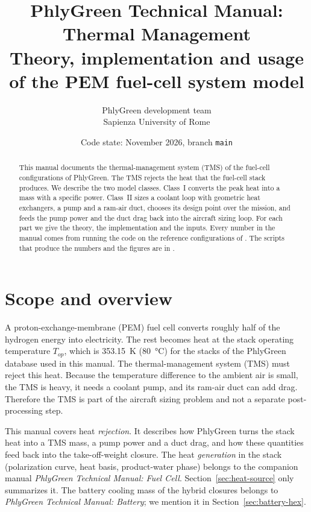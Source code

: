 \documentclass[a4paper,11pt]{article}
\title{PhlyGreen Technical Manual: Thermal Management\\[4pt]
\large Theory, implementation and usage of the PEM fuel-cell system model}
\author{PhlyGreen development team\\Sapienza University of Rome}
\date{Code state: November 2026, branch \texttt{main}}
\begin{document}
\maketitle

\begin{abstract}
\noindent This manual documents the thermal-management system (TMS) of the fuel-cell
configurations of PhlyGreen. The TMS rejects the heat that the fuel-cell stack produces. We
describe the two model classes. Class~I converts the peak heat into a mass with a specific
power. Class~II sizes a coolant loop with geometric heat exchangers, a pump and a ram-air
duct, chooses its design point over the mission, and feeds the pump power and the duct drag
back into the aircraft sizing loop. For each part we give the theory, the implementation and
the inputs. Every number in the manual comes from running the code on the reference
configurations of . The scripts that produce the numbers and
the figures are in .
\end{abstract}

\tableofcontents
\newpage

\section{Scope and overview}\label{sec:scope}

A proton-exchange-membrane (PEM) fuel cell converts roughly half of the hydrogen energy
into electricity. The rest becomes heat at the stack operating temperature $T_{op}$, which
is \SI{353.15}{K} (\SI{80}{\celsius}) for the stacks of the PhlyGreen database used in this
manual. The thermal-management system (TMS) must reject this heat. Because the temperature
difference to the ambient air is small, the TMS is heavy, it needs a coolant pump, and its
ram-air duct can add drag. Therefore the TMS is part of the aircraft sizing problem and not
a separate post-processing step.

This manual covers heat \emph{rejection}. It describes how PhlyGreen turns the stack heat
into a TMS mass, a pump power and a duct drag, and how these quantities feed back into the
take-off-weight closure. The heat \emph{generation} in the stack (polarization curve, heat
basis, product-water phase) belongs to the companion manual \emph{PhlyGreen Technical
Manual: Fuel Cell}. Section~\ref{sec:heat-source} only summarizes it. The battery cooling
mass of the hybrid closures belongs to \emph{PhlyGreen Technical Manual: Battery}; we
mention it in Section~\ref{sec:battery-hex}.
\end{document}
